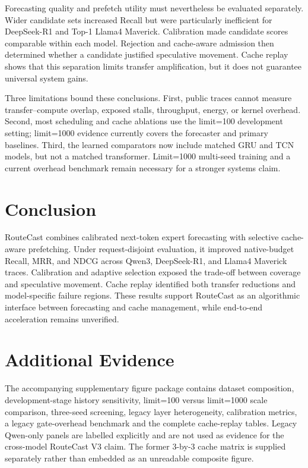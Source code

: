 \documentclass[conference]{IEEEtran}
\begin{document}
Forecasting quality and prefetch utility must nevertheless be evaluated separately. Wider candidate sets increased Recall but were particularly inefficient for DeepSeek-R1 and Top-1 Llama4 Maverick. Calibration made candidate scores comparable within each model. Rejection and cache-aware admission then determined whether a candidate justified speculative movement. Cache replay shows that this separation limits transfer amplification, but it does not guarantee universal system gains.

Three limitations bound these conclusions. First, public traces cannot measure transfer--compute overlap, exposed stalls, throughput, energy, or kernel overhead. Second, most scheduling and cache ablations use the limit=100 development setting; limit=1000 evidence currently covers the forecaster and primary baselines. Third, the learned comparators now include matched GRU and TCN models, but not a matched transformer. Limit=1000 multi-seed training and a current overhead benchmark remain necessary for a stronger systems claim.

\section{Conclusion}
RouteCast combines calibrated next-token expert forecasting with selective cache-aware prefetching. Under request-disjoint evaluation, it improved native-budget Recall, MRR, and NDCG across Qwen3, DeepSeek-R1, and Llama4 Maverick traces. Calibration and adaptive selection exposed the trade-off between coverage and speculative movement. Cache replay identified both transfer reductions and model-specific failure regions. These results support RouteCast as an algorithmic interface between forecasting and cache management, while end-to-end acceleration remains unverified.

\appendix
\section{Additional Evidence}
The accompanying supplementary figure package contains dataset composition, development-stage history sensitivity, limit=100 versus limit=1000 scale comparison, three-seed screening, legacy layer heterogeneity, calibration metrics, a legacy gate-overhead benchmark and the complete cache-replay tables. Legacy Qwen-only panels are labelled explicitly and are not used as evidence for the cross-model RouteCast V3 claim. The former 3-by-3 cache matrix is supplied separately rather than embedded as an unreadable composite figure.
\end{document}

